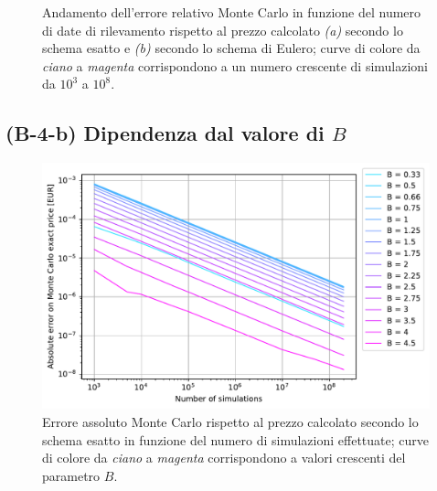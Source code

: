 \begin{figure}[t]
\begin{subfigure}{.5\textwidth}
  \caption{}
  \label{fig:euler_error_M}
\end{subfigure}
\caption{Andamento dell'errore relativo Monte Carlo in funzione del numero di date di rilevamento rispetto al prezzo calcolato \textit{(a)} secondo lo schema esatto e \textit{(b)} secondo lo schema di Eulero; curve di colore da \textit{ciano} a \textit{magenta} corrispondono a un numero crescente di simulazioni da ${10}^3$ a ${10}^8$.}
\end{figure}

\lipsum[1-3]

\subsection{(B-4-b) Dipendenza dal valore di $B$}

\begin{figure}[t]
    \centering
    \includegraphics[scale=0.5]{graphs/OptionPriceVsB_ExactErrorVsN_WithAllBs.pdf}
    \caption{Errore assoluto Monte Carlo rispetto al prezzo calcolato secondo lo schema esatto in funzione del numero di simulazioni effettuate; curve di colore da \textit{ciano} a \textit{magenta} corrispondono a valori crescenti del parametro $B$.}
    \label{fig:error_vs_B}
\end{figure}

